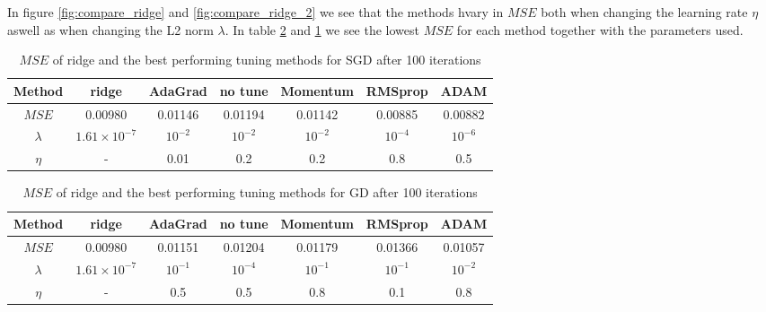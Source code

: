 \documentclass[11pt]{article}
\begin{document}
In figure \ref{fig:compare_ridge} and \ref{fig:compare_ridge_2} we see that the methods hvary in $MSE$ both when changing the learning rate $\eta$ aswell as when changing the L2 norm $\lambda$. In table \ref{tab:ridge_compare_GD} and \ref{tab:ridge_compare_SGD} we see the lowest $MSE$ for each method together with the parameters used.
\begin{table}[H]
  \centering
  \caption{$MSE$ of ridge and the best performing tuning methods for SGD after 100 iterations}
  \label{tab:ridge_compare_SGD}
  \begin{tabular}{|c|c|c|c|c|c|c|}
    \hline
    Method    & ridge               & AdaGrad   & no tune   & Momentum  & RMSprop   & ADAM      \\
    \hline
    $MSE$     & 0.00980             & 0.01146   & 0.01194   & 0.01142   & 0.00885   & 0.00882   \\
    \hline
    $\lambda$ & $1.61\times10^{-7}$ & $10^{-2}$ & $10^{-2}$ & $10^{-2}$ & $10^{-4}$ & $10^{-6}$ \\
    \hline
    $\eta$    & -                   & 0.01      & 0.2       & 0.2       & 0.8       & 0.5       \\
    \hline
  \end{tabular}
\end{table}
\begin{table}[H]
  \centering
  \caption{$MSE$ of ridge and the best performing tuning methods for GD after 100 iterations}
  \label{tab:ridge_compare_GD}
  \begin{tabular}{|c|c|c|c|c|c|c|}
    \hline
    Method    & ridge               & AdaGrad   & no tune   & Momentum  & RMSprop   & ADAM      \\
    \hline
    $MSE$     & 0.00980             & 0.01151   & 0.01204   & 0.01179   & 0.01366   & 0.01057   \\
    \hline
    $\lambda$ & $1.61\times10^{-7}$ & $10^{-1}$ & $10^{-4}$ & $10^{-1}$ & $10^{-1}$ & $10^{-2}$ \\
    \hline
    $\eta$    & -                   & 0.5       & 0.5       & 0.8       & 0.1       & 0.8       \\
    \hline
  \end{tabular}
\end{table}
\end{document}
